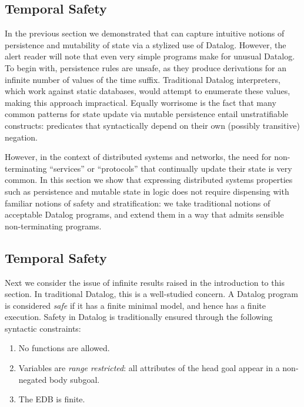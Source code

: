 \subsection{Temporal Safety}

In the previous section we demonstrated that \slang can capture
intuitive notions of persistence and mutability of state via a
stylized use of Datalog.  However, the alert reader will note that
even very simple \slang programs make for unusual Datalog.
To begin with, persistence rules are unsafe, as they produce derivations for an infinite number
of values of the time suffix.  Traditional Datalog interpreters, which
work against static databases, would attempt to enumerate these
values, making this approach impractical.
Equally worrisome is the fact that many common patterns for state update via mutable
persistence entail unstratifiable constructs: predicates that syntactically depend on their
own (possibly transitive) negation.  

However, in the context of distributed systems and networks, the need
for non-terminating ``services'' or ``protocols'' that continually update their
state
is very common.  In this section we show that expressing distributed systems properties
such as persistence and mutable state in logic does not require
dispensing with familiar notions of safety and stratification: we take
traditional notions of acceptable Datalog programs, and extend them in
a way that admits sensible non-terminating programs.

\subsection{Temporal Safety}
Next we consider the issue of infinite results raised in the introduction to this section.
In traditional Datalog, this is a well-studied concern.
A Datalog program is considered {\em safe} if it has a finite minimal model, and hence has
a finite execution.  Safety in Datalog is traditionally ensured
through the following syntactic constraints:

\begin{enumerate}
%
\item No functions are allowed.
%
\item Variables are \emph{range restricted}: all attributes of the head goal
appear in a non-negated body subgoal.
%
\item The EDB is finite.
%
\end{enumerate}


